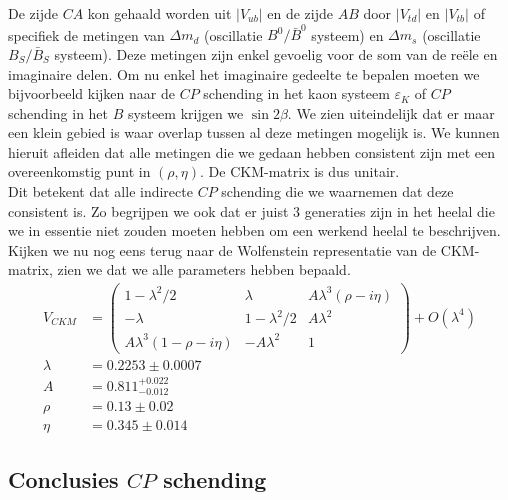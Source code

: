 \documentclass[../main.tex]{subfiles}
\begin{document}
De zijde $CA$ kon  gehaald worden uit $|V_{ub}|$ en de zijde $AB$ door $|V_{td}|$ en $|V_{tb}|$ of specifiek de metingen van $\Delta m_d$ (oscillatie $B^0/\bar{B}^0$ systeem) en $\Delta m_s$ (oscillatie $B_S/\bar{B}_S$ systeem). Deze metingen zijn enkel gevoelig voor de som van de reële en imaginaire delen. Om nu enkel het imaginaire gedeelte te bepalen moeten we bijvoorbeeld kijken naar de $CP$ schending in het kaon systeem $\varepsilon_K$ of $CP$ schending in het $B$ systeem krijgen we $\sin 2\beta$. We zien uiteindelijk dat er maar een klein gebied is waar overlap tussen al deze metingen mogelijk is. We kunnen hieruit afleiden dat alle metingen die we gedaan hebben consistent zijn met een overeenkomstig punt in $(\rho, \eta)$. De CKM-matrix is dus unitair.\\
Dit betekent dat alle indirecte $CP$ schending die we waarnemen dat deze consistent is. Zo begrijpen we ook dat er juist 3 generaties zijn in het heelal die we in essentie niet zouden moeten hebben om een werkend heelal te beschrijven. Kijken we nu nog eens terug naar de Wolfenstein representatie van de CKM-matrix, zien we dat we alle parameters hebben bepaald.
\begin{equation}
    \begin{aligned}
        \label{eq:wolfenstein_ckm_revisit}
        V_{C K M}&=\left(\begin{array}{ccc}
                1-\lambda^{2} / 2 & \lambda & A \lambda^{3}(\rho-i \eta) \\
                -\lambda & 1-\lambda^{2} / 2 & A \lambda^{2} \\
                A \lambda^{3}(1-\rho-i \eta) & -A \lambda^{2} & 1
        \end{array}\right)+O\left(\lambda^{4}\right)\\
        \lambda &=0.2253 \pm 0.0007 \\
        A &=0.811_{-0.012}^{+0.022} \\
        \rho &=0.13 \pm 0.02 \\
        \eta &=0.345 \pm 0.014
    \end{aligned}
\end{equation}

\subsection{Conclusies $CP$ schending}%
\label{sub:conclusies_cp_schending}
\end{document}
